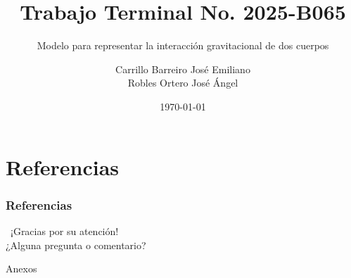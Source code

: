 \documentclass[spanish]{beamer}
\author[Carrillo B. José E. \&  Robles O. José A.]{Carrillo Barreiro José Emiliano \\ Robles Ortero José Ángel}
\title{Trabajo Terminal No. 2025-B065}
\subtitle{Modelo para representar la interacción gravitacional de dos cuerpos}
\institute{Instituto Politécnico Nacional \\ Escuela Superior de Cómputo}
\date{\today}
\begin{document}
    \begin{frame}
        \titlepage%
    \end{frame}

    
    
    
    
    
    
    

    \section{Referencias}

    \begin{frame}[allowframebreaks]
        \frametitle{Referencias}
        \begingroup
        \fontsize{6pt}{7pt}\selectfont
        \printbibliography[heading=none]
        \endgroup
    \end{frame}

    \begin{frame}
        \begin{center}
            {\Huge\calligra~¡Gracias por su atención!}\\
            ¿Alguna pregunta o comentario?
        \end{center}
    \end{frame}

    \appendix
    \makeatletter
    \renewcommand{\thesection}{\Alph{section}}
    \makeatother
    \setcounter{section}{0}

    \begin{frame}
        \begingroup
            \begin{center}
                {\Huge Anexos}
            \end{center}
        \endgroup
    \end{frame}
    
    
    
\end{document}
